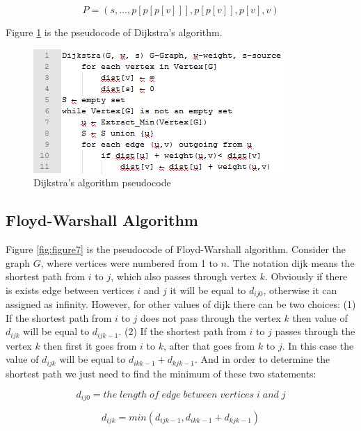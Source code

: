 \begin{equation}\label{finding-path-in-dijkstra}
P = ( s , … , p [ p [ p [ v ] ] ] , p [ p [ v ] ] , p [ v ] , v )	
\end{equation}

Figure \ref{fig:figure6} is the pseudocode of Dijkstra's algorithm.

\begin{figure}[h!]
	\centering
	\includegraphics[scale=1]{figure6.png}
	\caption{Dijkstra's algorithm pseudocode}
	\label{fig:figure6}
\end{figure}

\subsection{Floyd-Warshall Algorithm}
Figure \ref{fig:figure7} is the pseudocode of Floyd-Warshall algorithm. Consider the graph $G$, where vertices were numbered from 1 to $n$. The notation dijk means the shortest path from $i$ to $j$, which also passes through vertex $k$. Obviously if there is exists edge between vertices $i$ and $j$ it will be equal to $d_{ij0}$, otherwise it can assigned as infinity. However, for other values of dijk there can be two choices: (1) If the shortest path from $i$ to $j$ does not pass through the vertex $k$ then value of $d_{ijk}$ will be equal to $d_{ijk- 1}$. (2) If the shortest path from $i$ to $j$ passes through the vertex $k$ then first it goes from $i$ to $k$, after that goes from $k$ to $j$. In this case the value of $d_{ijk}$ will be equal to $d_{ikk-1} + d_{kjk-1}$. And in order to determine the shortest path we just need to find the minimum of these two statements:


\begin{equation}\label{length-between-i-j}
	d_{ij0} = the \; length \; of \; edge \; between \; vertices \; i \; and \; j
\end{equation}

\begin{equation}\label{length-between-i-j}
	d_{ijk} = min (d_{ijk-1}, d_{ikk-1} + d_{kjk-1})	
\end{equation}

